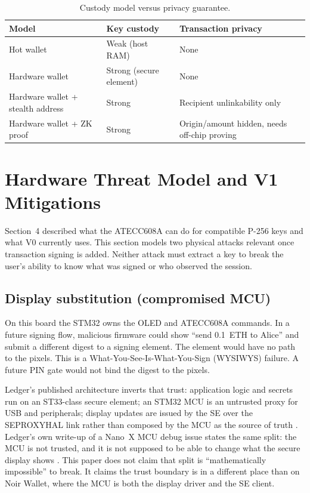 \documentclass[10pt]{article}
\begin{document}
\begin{table}[t]
  \centering
  \small
  \caption{Custody model versus privacy guarantee.}
  \label{tab:custody}
  \begin{tabular}{@{}p{2.1cm}p{2.1cm}p{2.3cm}@{}}
    \toprule
    \textbf{Model} & \textbf{Key custody} & \textbf{Transaction privacy} \\
    \midrule
    Hot wallet & Weak (host RAM) & None \\
    Hardware wallet & Strong (secure element) & None \\
    Hardware wallet + stealth address & Strong & Recipient unlinkability only \\
    Hardware wallet + ZK proof & Strong & Origin/amount hidden, needs off-chip proving \\
    \bottomrule
  \end{tabular}
\end{table}

\section{Hardware Threat Model and V1 Mitigations}

Section~4 described what the ATECC608A can do for compatible P-256 keys and what V0 currently uses. This section models two physical attacks relevant once transaction signing is added. Neither attack must extract a key to break the user's ability to know what was signed or who observed the session.

\subsection{Display substitution (compromised MCU)}
On this board the STM32 owns the OLED and ATECC608A commands. In a future signing flow, malicious firmware could show ``send 0.1~ETH to Alice'' and submit a different digest to a signing element. The element would have no path to the pixels. This is a What-You-See-Is-What-You-Sign (WYSIWYS) failure. A future PIN gate would not bind the digest to the pixels.

Ledger's published architecture inverts that trust: application logic and secrets run on an ST33-class secure element; an STM32 MCU is an untrusted proxy for USB and peripherals; display updates are issued by the SE over the SEPROXYHAL link rather than composed by the MCU as the source of truth \cite{ledger-hw}. Ledger's own write-up of a Nano~X MCU debug issue states the same split: the MCU is not trusted, and it is not supposed to be able to change what the secure display shows \cite{ledger-nanox}. This paper does not claim that split is ``mathematically impossible'' to break. It claims the trust boundary is in a different place than on Noir Wallet, where the MCU is both the display driver and the SE client.
\end{document}
